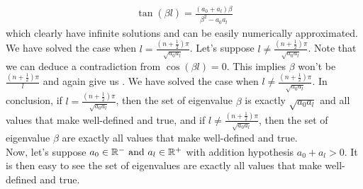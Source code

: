 \documentclass{report}
\begin{document}
\begin{mdframed}
\begin{align}
\label{bl}
\tan (\beta l)= \frac{(a_0+a_l)\beta  }{\beta ^2-a_0a_l}
\end{align}
which clearly have infinite solutions and can be easily numerically approximated.  We have solved the case when $l=\frac{(n+\frac{1}{2})\pi }{\sqrt{a_0a_l} }$. Let's suppose $l\neq \frac{(n+\frac{1}{2})\pi }{\sqrt{a_0a_l} }$. Note that we can deduce a contradiction from $\cos (\beta l)=0$. This implies $\beta $ won't be $\frac{(n+\frac{1}{2})\pi }{l}$ and again give us . We have solved the case when $l\neq \frac{(n+\frac{1}{2})\pi }{\sqrt{a_0a_l} }$. In conclusion, if $l= \frac{(n+\frac{1}{2})\pi }{\sqrt{a_0a_l}}$, then the set of eigenvalue $\beta $ is exactly $\sqrt{a_0a_l} $ and all values that make  well-defined and true, and if $l \neq \frac{(n+\frac{1}{2})\pi }{\sqrt{a_0a_l} }$, then the set of eigenvalue $\beta $ are exactly all values that make  well-defined and true.\\

Now, let's suppose $a_0\in\mathbb{R}^-\text{ and }a_l\in\mathbb{R}^+$ with addition hypothesis $a_0+a_l>0$. It is then easy to see the set of eigenvalues are exactly all values that make  well-defined and true.   
\end{mdframed}
\end{document}
